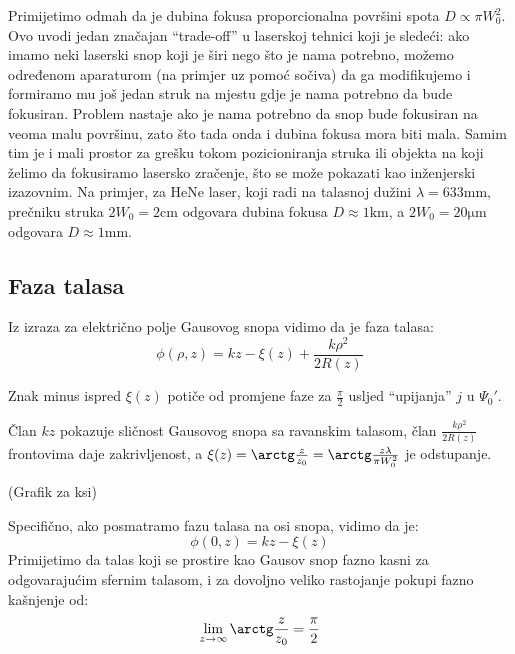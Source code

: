 \documentclass[fleqn]{report}
\begin{document}
Primijetimo odmah da je dubina fokusa proporcionalna površini spota $D \propto \pi W_0^2$.
Ovo uvodi jedan značajan \enquote{trade-off} u laserskoj tehnici koji je sledeći:
ako imamo neki laserski snop koji je širi nego što je nama potrebno, možemo određenom aparaturom (na primjer uz pomoć sočiva) da ga modifikujemo i formiramo mu još jedan struk na mjestu gdje je nama potrebno da bude fokusiran.
Problem nastaje ako je nama potrebno da snop bude fokusiran na veoma malu površinu, zato što tada onda i dubina fokusa mora biti mala.
Samim tim je i mali prostor za grešku tokom pozicioniranja struka ili objekta na koji želimo da fokusiramo lasersko zračenje, što se može pokazati kao inženjerski izazovnim.
Na primjer, za HeNe laser, koji radi na talasnoj dužini $\lambda = 633\si{\milli\meter}$, prečniku struka $2W_0 = 2\si{\centi\meter}$ odgovara dubina fokusa $D \approx 1\si{\kilo\meter}$, a $2W_0 = 20\si{\micro\meter}$ odgovara $D \approx 1\si{\milli\meter}$.

\subsection{Faza talasa}
Iz izraza za električno polje Gausovog snopa vidimo da je faza talasa:
\begin{equation*}
    \phi(\rho, z) = kz - \xi(z) + \frac{k\rho^2}{2R(z)}
\end{equation*}
\begin{tbox}
    Znak minus ispred $\xi(z)$ potiče od promjene faze za $\frac{\pi}{2}$ usljed \enquote{upijanja} $j$ u $\Psi_0'$.
\end{tbox}
Član $kz$ pokazuje sličnost Gausovog snopa sa ravanskim talasom, član $\frac{k\rho^2}{2R(z)}$ frontovima daje zakrivljenost, a $\xi(z) = \arctg\frac{z}{z_0} = \arctg\frac{z\lambda}{\pi W_0^2}$ je odstupanje.

(Grafik za ksi)

Specifično, ako posmatramo fazu talasa na osi snopa, vidimo da je:
\begin{equation*}
    \phi(0, z) = kz - \xi(z)
\end{equation*}
Primijetimo da talas koji se prostire kao Gausov snop fazno kasni za odgovarajućim sfernim talasom, i za dovoljno veliko rastojanje pokupi fazno kašnjenje od:
\begin{equation*}
    \lim_{z \to \infty} \arctg\frac{z}{z_0} = \frac{\pi}{2}
\end{equation*}
\end{document}
